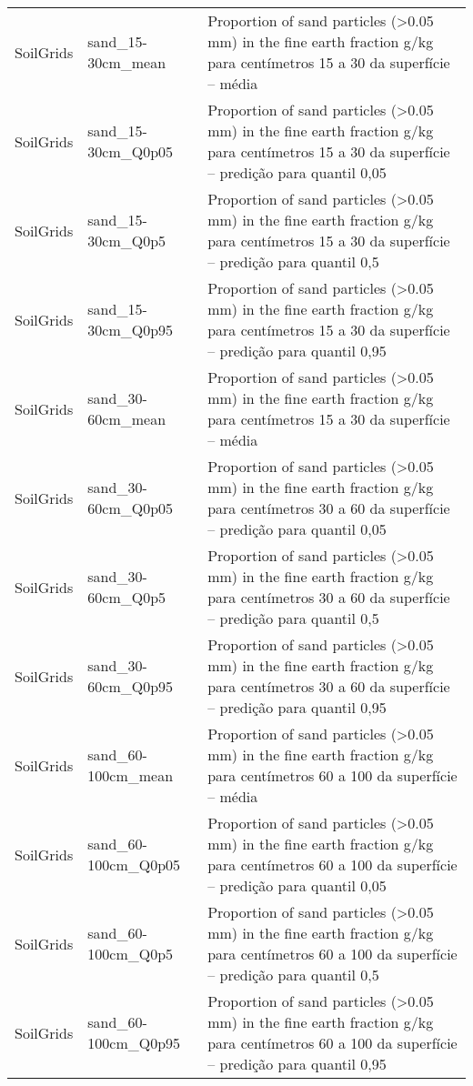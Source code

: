 \begin{longtable}{@{} p{4cm} p{4cm} p{8cm} @{}}
	SoilGrids &
	sand\_15-30cm\_mean &
	Proportion of sand particles (\textgreater 0.05 mm) in the fine earth fraction g/kg para centímetros 15 a 30 da superfície – média \\
	SoilGrids &
	sand\_15-30cm\_Q0p05 &
	Proportion of sand particles (\textgreater 0.05 mm) in the fine earth fraction g/kg para centímetros 15 a 30 da superfície – predição para quantil 0,05 \\
	SoilGrids &
	sand\_15-30cm\_Q0p5 &
	Proportion of sand particles (\textgreater 0.05 mm) in the fine earth fraction g/kg para centímetros 15 a 30 da superfície – predição para quantil 0,5 \\
	SoilGrids &
	sand\_15-30cm\_Q0p95 &
	Proportion of sand particles (\textgreater 0.05 mm) in the fine earth fraction g/kg para centímetros 15 a 30 da superfície – predição para quantil 0,95 \\
	SoilGrids &
	sand\_30-60cm\_mean &
	Proportion of sand particles (\textgreater 0.05 mm) in the fine earth fraction g/kg para centímetros 15 a 30 da superfície – média \\
	SoilGrids &
	sand\_30-60cm\_Q0p05 &
	Proportion of sand particles (\textgreater 0.05 mm) in the fine earth fraction g/kg para centímetros 30 a 60 da superfície – predição para quantil 0,05 \\
	SoilGrids &
	sand\_30-60cm\_Q0p5 &
	Proportion of sand particles (\textgreater 0.05 mm) in the fine earth fraction g/kg para centímetros 30 a 60 da superfície – predição para quantil 0,5 \\
	SoilGrids &
	sand\_30-60cm\_Q0p95 &
	Proportion of sand particles (\textgreater 0.05 mm) in the fine earth fraction g/kg para centímetros 30 a 60 da superfície – predição para quantil 0,95 \\
	SoilGrids &
	sand\_60-100cm\_mean &
	Proportion of sand particles (\textgreater 0.05 mm) in the fine earth fraction g/kg para centímetros 60 a 100 da superfície – média \\
	SoilGrids &
	sand\_60-100cm\_Q0p05 &
	Proportion of sand particles (\textgreater 0.05 mm) in the fine earth fraction g/kg para centímetros 60 a 100 da superfície – predição para quantil 0,05 \\
	SoilGrids &
	sand\_60-100cm\_Q0p5 &
	Proportion of sand particles (\textgreater 0.05 mm) in the fine earth fraction g/kg para centímetros 60 a 100 da superfície – predição para quantil 0,5 \\
	SoilGrids &
	sand\_60-100cm\_Q0p95 &
	Proportion of sand particles (\textgreater 0.05 mm) in the fine earth fraction g/kg para centímetros 60 a 100 da superfície – predição para quantil 0,95 \\

\end{longtable}
